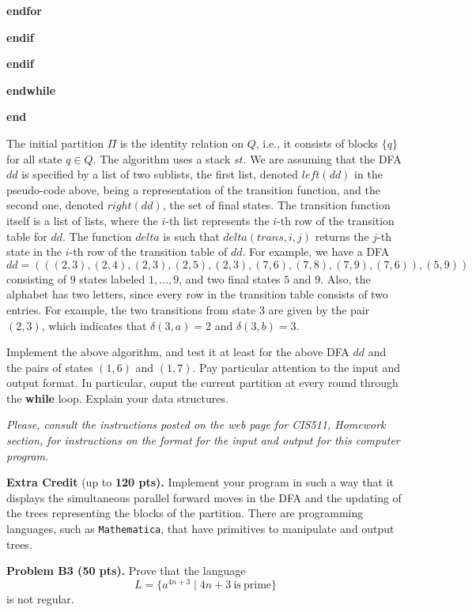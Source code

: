 \documentclass[12pt]{article}
\begin{document}
\smallskip
\quad\quad\quad\quad\quad
                {\bf endfor}

\smallskip
\quad\quad\quad\quad
          {\bf endif}

\smallskip
\quad\quad\quad
     {\bf endif}

\smallskip
\quad\quad
  {\bf endwhile}

\smallskip
\quad
{\bf end}

\medskip
The initial partition $\Pi$ is the identity relation
on $Q$, i.e., it consists of blocks $\{q\}$
for all state $q\in Q$.
The algorithm uses a stack $st$.
We are assuming that the DFA $dd$ is specified
by a list of two sublists, the first list,
denoted $left(dd)$ in the pseudo-code above, being
a representation of the transition function, and the second
one, denoted $right(dd)$,  
the set of final states. The transition function itself
is a list of lists, where the $i$-th list represents the
$i$-th row of the transition table for $dd$.
The function $delta$ is such that $delta(trans,i,j)$ returns
the $j$-th state in the $i$-th row of the transition table of $dd$.
For example, we have a DFA
$$dd = (((2, 3), (2, 4), (2, 3), (2, 5), (2, 3), 
        (7, 6), (7, 8), (7, 9), (7, 6)), (5, 9))$$
consisting of $9$ states labeled $1, \ldots, 9$,
and two final states $5$ and $9$. Also, the alphabet
has two letters, since every row in the transition
table consists of two entries. For example, the two transitions
from state $3$ are given by the pair $(2, 3)$,
which indicates that $\delta(3, a) = 2$ and $\delta(3, b) = 3$. 

\medskip
Implement the above algorithm, and test it at least for the above DFA $dd$
and the pairs of states $(1, 6)$ and $(1, 7)$.
Pay particular attention to the input and output format.
In particular, ouput the current partition at every round through the
{\bf while} loop.
Explain your data structures.

\medskip
{\it 
Please, consult the instructions posted on the web page for
CIS511, Homework section, for instructions on the
format for the input and output for this computer program.
}

\vspace {0.25cm}\noindent
{\bf Extra Credit\/} (up to {\bf 120 pts).\/}
Implement your program in such a way that
it displays the simultaneous parallel forward moves
in the DFA and the updating of the trees
representing the blocks of the partition.  There are programming
languages, such as {\tt Mathematica}, that have primitives to
manipulate and output trees.

\vspace{0.25cm}\noindent
{\bf Problem B3 (50 pts).} 
Prove that the language
\[
L = \{a^{4n + 3} \mid 4n + 3 \> \mathrm{is\ prime}\}
\]
is not regular.
\end{document}

